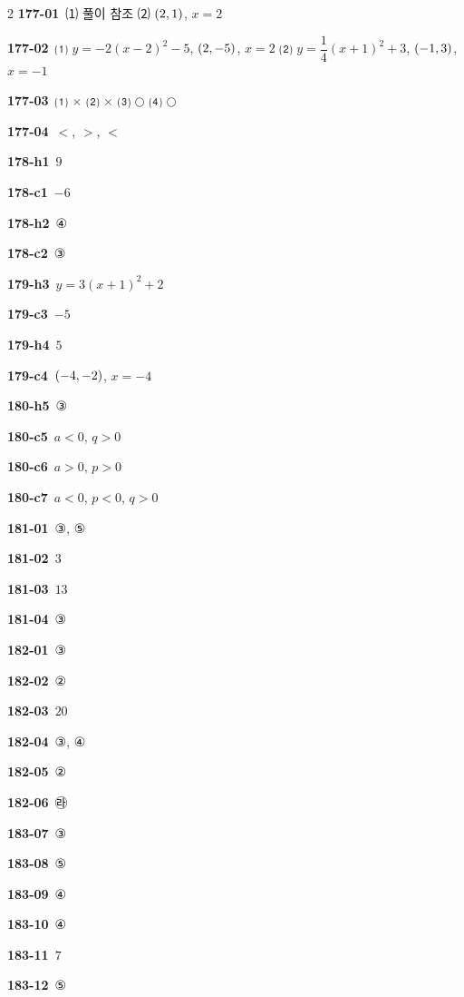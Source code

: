 \documentclass[10pt,a4paper]{article}
\begin{document}
\begin{multicols}{2}
\noindent\textbf{177-01}\ ⑴ 풀이 참조 ⑵ $(2{,}\mkern3mu\mathopen{}1)$, $x=2$\par
\noindent\textbf{177-02}\ ⑴ $y=-2(x-2)^2-5$, $(2{,}\mkern3mu\mathopen{}-5)$, $x=2$ ⑵ $y=\dfrac{1}{4}(x+1)^2+3$, $(-1{,}\mkern3mu\mathopen{}3)$, $x=-1$\par
\noindent\textbf{177-03}\ ⑴ $\times$ ⑵ $\times$ ⑶ $\bigcirc$ ⑷ $\bigcirc$\par
\noindent\textbf{177-04}\ $<$, $>$, $<$\par
\noindent\textbf{178-h1}\ $9$\par
\noindent\textbf{178-c1}\ $-6$\par
\noindent\textbf{178-h2}\ ④\par
\noindent\textbf{178-c2}\ ③\par
\noindent\textbf{179-h3}\ $y=3(x+1)^2+2$\par
\noindent\textbf{179-c3}\ $-5$\par
\noindent\textbf{179-h4}\ $5$\par
\noindent\textbf{179-c4}\ $(-4{,}\mkern3mu\mathopen{}-2)$, $x=-4$\par
\noindent\textbf{180-h5}\ ③\par
\noindent\textbf{180-c5}\ $a<0$, $q>0$\par
\noindent\textbf{180-c6}\ $a>0$, $p>0$\par
\noindent\textbf{180-c7}\ $a<0$, $p<0$, $q>0$\par
\noindent\textbf{181-01}\ ③, ⑤\par
\noindent\textbf{181-02}\ $3$\par
\noindent\textbf{181-03}\ $13$\par
\noindent\textbf{181-04}\ ③\par
\noindent\textbf{182-01}\ ③\par
\noindent\textbf{182-02}\ ②\par
\noindent\textbf{182-03}\ $20$\par
\noindent\textbf{182-04}\ ③, ④\par
\noindent\textbf{182-05}\ ②\par
\noindent\textbf{182-06}\ ㉱\par
\noindent\textbf{183-07}\ ③\par
\noindent\textbf{183-08}\ ⑤\par
\noindent\textbf{183-09}\ ④\par
\noindent\textbf{183-10}\ ④\par
\noindent\textbf{183-11}\ $7$\par
\noindent\textbf{183-12}\ ⑤\par

\end{multicols}
\end{document}
